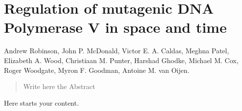 \chapter[Regulation of mutagenic Pol V in space and time]{Regulation of mutagenic DNA Polymerase V in space and time}
\label{chapter_plos}

Andrew Robinson, John P. McDonald, Victor E. A. Caldas, Meghna Patel, Elizabeth A. Wood, Christiaan M. Punter, Harshad Ghodke, Michael M. Cox, Roger Woodgate, Myron F. Goodman, Antoine M. van Oijen.\\



\begin{abstract}
	Write here the Abstract
\end{abstract}

\newpage

Here starts your content.